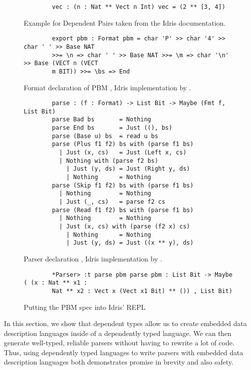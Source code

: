 \begin{figure}[h]
    \caption{Example for Dependent Pairs taken from the Idris documentation.}
    \label{dependentPairExample}
    \begin{lstlisting}
        vec : (n : Nat ** Vect n Int) vec = (2 ** [3, 4])
    \end{lstlisting}
\end{figure}

\begin{figure}[h]
    \caption{Format declaration of PBM \cite{power_of_pi}, Idris implementation
    by \cite{idris_pop}.}
    \label{spec_declaration}
    \begin{lstlisting}
        export pbm : Format pbm = char 'P' >> char '4' >> char ' ' >> Base NAT
        >>= \n => char ' ' >> Base NAT >>= \m => char '\n' >> Base (VECT n (VECT
        m BIT)) >>= \bs => End
    \end{lstlisting}
\end{figure}


\begin{figure}[h]
    \caption{Parser declaration \cite{power_of_pi}, Idris implementation by
    \cite{idris_pop}.}
    \label{parser}
    \begin{lstlisting}
        parse : (f : Format) -> List Bit -> Maybe (Fmt f, List Bit)
        parse Bad bs       = Nothing
        parse End bs       = Just ((), bs)
        parse (Base u) bs  = read u bs
        parse (Plus f1 f2) bs with (parse f1 bs)
          | Just (x, cs)   = Just (Left x, cs)
          | Nothing with (parse f2 bs)
            | Just (y, ds) = Just (Right y, ds)
            | Nothing      = Nothing
        parse (Skip f1 f2) bs with (parse f1 bs)
          | Nothing        = Nothing
          | Just (_, cs)   = parse f2 cs
        parse (Read f1 f2) bs with (parse f1 bs)
          | Nothing        = Nothing
          | Just (x, cs) with (parse (f2 x) cs)
            | Nothing      = Nothing
            | Just (y, ds) = Just ((x ** y), ds)
    \end{lstlisting}
\end{figure}

\begin{figure}
    \caption{Putting the PBM spec into Idris' REPL}
    \label{repl}
    \begin{lstlisting}
        *Parser> :t parse pbm parse pbm : List Bit -> Maybe ( (x : Nat ** x1 :
        Nat ** x2 : Vect x (Vect x1 Bit) ** ()) , List Bit)
    \end{lstlisting}
\end{figure}

In this section, we show that dependent types allow us to create embedded data
description languages inside of a dependently typed language. We can then
generate well-typed, reliable parsers without having to rewrite a lot of code.
Thus, using dependently typed languages to write parsers with embedded data
description languages both demonstrates promise in brevity and also safety. 
